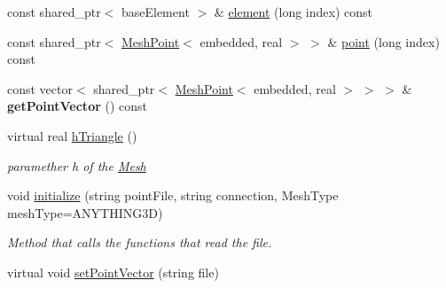\begin{DoxyCompactItemize}
\item 
const shared\+\_\+ptr$<$ base\+Element $>$ \& \hyperlink{class_mesh_a4a1745c0291384760349262dca8ca27c}{element} (long index) const 
\item 
const shared\+\_\+ptr$<$ \hyperlink{class_mesh_point}{Mesh\+Point}$<$ embedded, real $>$ $>$ \& \hyperlink{class_mesh_a41e57256500b30c8a79e32ce070ff2d1}{point} (long index) const 
\item 
const vector$<$ shared\+\_\+ptr$<$ \hyperlink{class_mesh_point}{Mesh\+Point}$<$ embedded, real $>$ $>$ $>$ \& {\bfseries get\+Point\+Vector} () const \hypertarget{class_mesh_ae589a7d04810b2ca182ce577c9976400}{}\label{class_mesh_ae589a7d04810b2ca182ce577c9976400}

\item 
virtual real \hyperlink{class_mesh_a828737450d4876e720c518ef362fa52a}{h\+Triangle} ()\hypertarget{class_mesh_a828737450d4876e720c518ef362fa52a}{}\label{class_mesh_a828737450d4876e720c518ef362fa52a}

\begin{DoxyCompactList}\small\item\em paramether h of the \hyperlink{class_mesh}{Mesh} \end{DoxyCompactList}\item 
void \hyperlink{class_mesh_adbdd6ff691886a2a8e9ec8192c9b0469}{initialize} (string point\+File, string connection, Mesh\+Type mesh\+Type=A\+N\+Y\+T\+H\+I\+N\+G3D)
\begin{DoxyCompactList}\small\item\em Method that calls the functions that read the file. \end{DoxyCompactList}\item 
virtual void \hyperlink{class_mesh_abb728c88ecb80918cdcc0408eb5cb0c6}{set\+Point\+Vector} (string file)\hypertarget{class_mesh_abb728c88ecb80918cdcc0408eb5cb0c6}{}\label{class_mesh_abb728c88ecb80918cdcc0408eb5cb0c6}


\end{DoxyCompactItemize}
